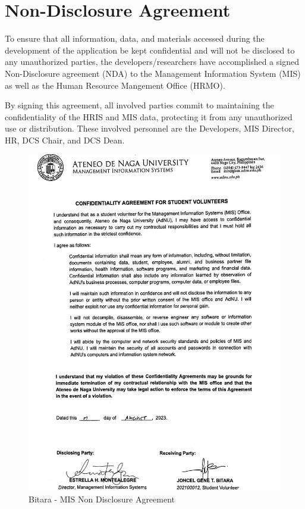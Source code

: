 \chapter{Non-Disclosure Agreement}

\label{nda}

To ensure that all information, data, and materials accessed during the development of the application be kept confidential and will not be disclosed to any unauthorized parties, the developers/researchers have accomplished a signed Non-Disclosure agreement (NDA) to the Management Information System (MIS) as well as the Human Resource Mangement Office (HRMO). 

By signing this agreement, all involved parties commit to maintaining the confidentiality of the HRIS and MIS data, protecting it from any unauthorized use or distribution. These involved personnel are the Developers, MIS Director, HR, DCS Chair, and DCS Dean.

\begin{figure}[H]
    \centering
    \includegraphics[width=1\textwidth]{figures/images/nda/mis-nda-bitara.JPG}
    \caption{Bitara - MIS Non Disclosure Agreement}
    \label{fig:mis-nda-bitara}
\end{figure}

